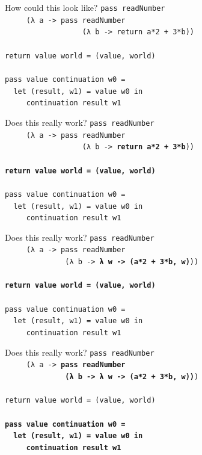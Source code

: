 \documentclass{beamer}
\begin{document}
\begin{frame}{How could this look like?}
  \texttt{pass readNumber \\
    \ \ \ \ \ (λ a \pause -> pass readNumber \\
    \ \ \ \ \ \ \ \ \ \ \ \ \ \ \ \ \ \ (λ b \pause -> return a*2 + 3*b)) \\
    \ \\ \pause
    return value world = (value, world) \\ \pause
    \ \\
    pass value continuation w0 = \\
    \ \ let (result, w1) = value w0 in \\
    \ \ \ \ \ continuation result w1
  }
\end{frame}

\begin{frame}{Does this really work?}
  \texttt{pass readNumber\\
    \ \ \ \ \ (λ a -> pass readNumber\\
    \ \ \ \ \ \ \ \ \ \ \ \ \ \ \ \ \ \ (λ b -> \textbf{return a*2 + 3*b}))\\
    \ \\ \pause
    \textbf{return value world = (value, world)} \\ \pause
    \ \\
    pass value continuation w0 = \\
    \ \ let (result, w1) = value w0 in \\
    \ \ \ \ \ continuation result w1
  }
\end{frame}

\begin{frame}{Does this really work?}
  \texttt{pass readNumber\\
    \ \ \ \ \ (λ a -> pass readNumber\\
    \ \ \ \ \ \ \ \ \ \ \ \ \ \ (λ b -> \textbf{λ w -> (a*2 + 3*b, w)}))\\
    \ \\
    \textbf{return value world = (value, world)} \\
    \ \\
    pass value continuation w0 = \\
    \ \ let (result, w1) = value w0 in \\
    \ \ \ \ \ continuation result w1
  }
\end{frame}

\begin{frame}{Does this really work?}
  \texttt{pass readNumber\\
    \ \ \ \ \ (λ a -> \textbf{pass readNumber\\
      \ \ \ \ \ \ \ \ \ \ \ \ \ \ (λ b -> λ w -> (a*2 + 3*b, w))})\\
    \ \\
    return value world = (value, world) \\
    \ \\
    \textbf{pass value continuation w0 = \\
      \ \ let (result, w1) = value w0 in \\
      \ \ \ \ \ continuation result w1}
  }
\end{frame}
\end{document}
